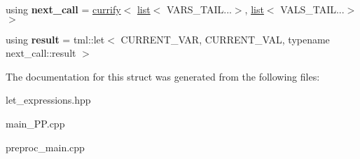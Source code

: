 \begin{DoxyCompactItemize}
\item 
\hypertarget{structtml_1_1impl_1_1multi__let__currifier_1_1currify_3_01list_3_01CURRENT__VAR_00_01VARS__TAIL_0ea6fde6f25a35f6c4f514840e32dfa6_a5dacf4be2ea2cea7e88ece32e5e13adc}{using {\bfseries next\+\_\+call} = \hyperlink{structtml_1_1impl_1_1multi__let__currifier_1_1currify}{currify}$<$ \hyperlink{structtml_1_1list}{list}$<$ V\+A\+R\+S\+\_\+\+T\+A\+I\+L...$>$, \hyperlink{structtml_1_1list}{list}$<$ V\+A\+L\+S\+\_\+\+T\+A\+I\+L...$>$$>$}\label{structtml_1_1impl_1_1multi__let__currifier_1_1currify_3_01list_3_01CURRENT__VAR_00_01VARS__TAIL_0ea6fde6f25a35f6c4f514840e32dfa6_a5dacf4be2ea2cea7e88ece32e5e13adc}

\item 
\hypertarget{structtml_1_1impl_1_1multi__let__currifier_1_1currify_3_01list_3_01CURRENT__VAR_00_01VARS__TAIL_0ea6fde6f25a35f6c4f514840e32dfa6_a1f1d26665731e0bab4ca7c8a6db8870f}{using {\bfseries result} = tml\+::let$<$ C\+U\+R\+R\+E\+N\+T\+\_\+\+V\+A\+R, C\+U\+R\+R\+E\+N\+T\+\_\+\+V\+A\+L, typename next\+\_\+call\+::result $>$}\label{structtml_1_1impl_1_1multi__let__currifier_1_1currify_3_01list_3_01CURRENT__VAR_00_01VARS__TAIL_0ea6fde6f25a35f6c4f514840e32dfa6_a1f1d26665731e0bab4ca7c8a6db8870f}

\end{DoxyCompactItemize}


The documentation for this struct was generated from the following files\+:\begin{DoxyCompactItemize}
\item 
let\+\_\+expressions.\+hpp\item 
main\+\_\+\+P\+P.\+cpp\item 
preproc\+\_\+main.\+cpp\end{DoxyCompactItemize}
